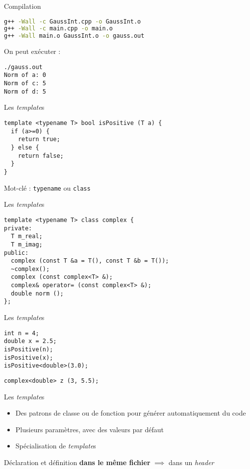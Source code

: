 \begin{frame}[fragile]{Compilation}
  \begin{lstlisting}[language=bash]
g++ -Wall -c GaussInt.cpp -o GaussInt.o
g++ -Wall -c main.cpp -o main.o
g++ -Wall main.o GaussInt.o -o gauss.out
  \end{lstlisting}

  On peut exécuter :
  \begin{lstlisting}
./gauss.out
Norm of a: 0
Norm of c: 5
Norm of d: 5
  \end{lstlisting}
\end{frame}

\begin{frame}[fragile]{Les \textit{template}s}
  \begin{lstlisting}
template <typename T> bool isPositive (T a) {
  if (a>=0) {
    return true;
  } else {
    return false;
  }
}
  \end{lstlisting}

  Mot-clé : \texttt{typename} ou \texttt{class}
\end{frame}

\begin{frame}[fragile]{Les \textit{template}s}
  \begin{lstlisting}
template <typename T> class complex {
private:
  T m_real;
  T m_imag;
public:
  complex (const T &a = T(), const T &b = T());
  ~complex();
  complex (const complex<T> &);
  complex& operator= (const complex<T> &);
  double norm ();
};
  \end{lstlisting}
\end{frame}

\begin{frame}[fragile]{Les \textit{template}s}
  \begin{lstlisting}
int n = 4;
double x = 2.5;
isPositive(n);
isPositive(x);
isPositive<double>(3.0);
  \end{lstlisting}

  \begin{lstlisting}
complex<double> z (3, 5.5);
  \end{lstlisting}
\end{frame}

\begin{frame}{Les \textit{template}s}
  \begin{itemize}
  \item  Des patrons de classe ou de fonction pour générer automatiquement du code
  \item Plusieurs paramètres, avec des valeurs par défaut
  \item Spécialisation de \textit{template}s
  \end{itemize}

  Déclaration et définition \textbf{dans le même fichier} $\implies$ dans un \textit{header}
\end{frame}

